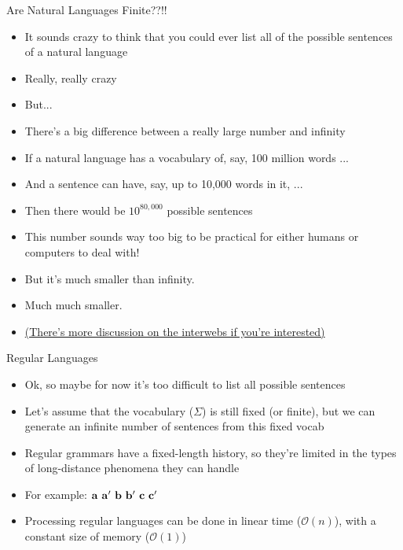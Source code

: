 \documentclass{beamer}
\newcommand{\detail}[1]{{\color{lightgrey}\small{}#1}}
\begin{document}
\begin{frame}{Are Natural Languages Finite??!!}
\begin{block}{}
\begin{itemize}
	\item It sounds crazy to think that you could ever list all of the possible sentences of a natural language
	\pause
	\item Really, really crazy
	\pause
	\item But...
	\pause
	\item There's a big difference between a really large number and infinity
	\pause
	\item {\small If a natural language has a vocabulary of, say, 100 million words ...}
	\pause
	\item And a sentence can have, say, up to 10,000 words in it, ...
	\pause
	\item Then there would be $10^{80,000}$ possible sentences
	\pause
	\item This number sounds way too big to be practical for either humans or computers to deal with!
	\pause
	\item But it's much smaller than infinity.
	\pause
	\item Much much smaller.
	\pause
	\item \tiny{\href{http://people.umass.edu/~partee/726_04/lectures/Is_Language_Infinite.pdf}{(There's more discussion on the interwebs if you're interested)}}
\end{itemize}
\end{block}
\end{frame}


\begin{frame}{Regular Languages}
\begin{block}{}
\begin{itemize}
	\item Ok, so maybe for now it's too difficult to list all possible sentences
	\item Let's assume that the vocabulary ($\Sigma$) is still fixed (or finite), but we can generate an infinite number of sentences from this fixed vocab
	\item Regular grammars have a fixed-length history, so they're limited in the types of long-distance phenomena they can handle
	\pause
	\item For example: $\bf a \ a^{\prime} \ b \ b^{\prime} \ c \ c^{\prime}$
	\pause
	\item Processing regular languages can be done in linear time \detail{($\mathcal{O}(n)$)}, with a constant size of memory \detail{($\mathcal{O}(1)$)}
\end{itemize}
\end{block}
\end{frame}
\end{document}
